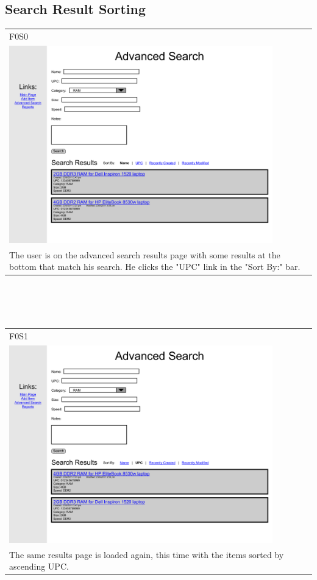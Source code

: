 \documentclass{article}
\begin{document}
\subsection{Search Result Sorting}
\begin{tabular}{ p{4.5in} }
F0S0\\
\includegraphics[keepaspectratio, width=4.5in]{sortResultsF0S0.pdf} \\
The user is on the advanced search results page with some results at the bottom that match his search. He clicks the "UPC" link in the "Sort By:" bar. 
\end{tabular}\\
~\\
~\\
\begin{tabular}{ p{4.5in} }
F0S1\\
\includegraphics[keepaspectratio, width=4.5in]{sortResultsF0S1.pdf} \\
The same results page is loaded again, this time with the items sorted by ascending UPC.
\end{tabular}
\end{document}
